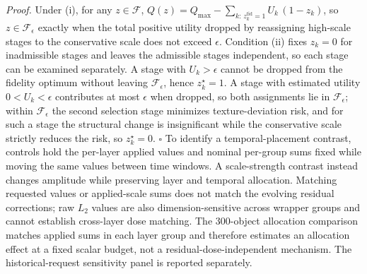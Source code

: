 \documentclass[times,twocolumn,final]{elsarticle}
\providecommand{\DIFadd}[1]{{\protect\color{blue} \sf #1}} %
\providecommand{\DIFdel}[1]{{\protect\color{red} \scriptsize #1}} %
\providecommand{\DIFaddbegin}{} %
\providecommand{\DIFaddend}{} %
\providecommand{\DIFdelbegin}{} %
\providecommand{\DIFdelend}{} %
\begin{document}
\DIFdelbegin %
\DIFdel{\textit{Proof.} Under (i), for any $z\in\mathcal{F}$, $Q(z)=Q_{\max}-\sum_{k:\,z_k^{\mathrm{fid}}=1}U_k\,(1-z_k)$, so $z\in\mathcal{F}_\epsilon$ exactly when the total positive utility dropped by reassigning high-scale stages to the conservative scale does not exceed $\epsilon$. Condition (ii) fixes $z_k=0$ for inadmissible stages and leaves the admissible stages independent, so each stage can be examined separately. A stage with $U_k>\epsilon$ cannot be dropped from the fidelity optimum without leaving $\mathcal{F}_\epsilon$, hence $z_k^{\star}=1$. A stage with estimated utility $0<U_k<\epsilon$ contributes at most $\epsilon$ when dropped, so both assignments lie in $\mathcal{F}_\epsilon$; within $\mathcal{F}_\epsilon$ the second selection stage minimizes texture-deviation risk, and for such a stage the structural change is insignificant while the conservative scale strictly reduces the risk, so $z_k^{\star}=0$. }%
\DIFdel{$\square$
}%
\DIFdelend \DIFaddbegin \DIFadd{To identify a temporal-placement contrast, controls hold the per-layer applied values and nominal per-group sums fixed while moving the same values between time windows. A scale-strength contrast instead changes amplitude while preserving layer and temporal allocation. Matching requested values or applied-scale sums does not match the evolving residual corrections; raw $L_2$ values are also dimension-sensitive across wrapper groups and cannot establish cross-layer dose matching. The 300-object allocation comparison matches applied sums in each layer group and therefore estimates an allocation effect at a fixed scalar budget, not a residual-dose-independent mechanism. The historical-request sensitivity panel is reported separately.
}\DIFaddend
\end{document}
